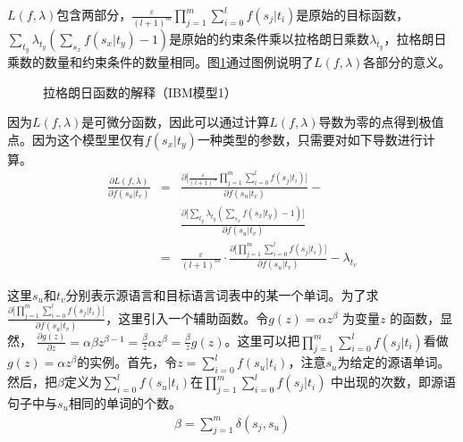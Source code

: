 \vspace{-0.3em}
\parinterval $L(f,\lambda)$包含两部分，$\frac{\varepsilon}{(l+1)^m}\prod_{j=1}^{m}\sum_{i=0}^{l}{f(s_j|t_i)}$是原始的目标函数，\\$\sum_{t_y}{\lambda_{t_y}(\sum_{s_x}{f(s_x|t_y)}-1)}$是原始的约束条件乘以拉格朗日乘数$\lambda_{t_y}$，拉格朗日乘数的数量和约束条件的数量相同。图\ref{fig:5-23}通过图例说明了$L(f,\lambda)$各部分的意义。

\begin{figure}[htp]
    \centering

   \caption{拉格朗日函数的解释（IBM模型1）}
   \label{fig:5-23}
\end{figure}

\noindent 因为$L(f,\lambda)$是可微分函数，因此可以通过计算$L(f,\lambda)$导数为零的点得到极值点。因为这个模型里仅有$f(s_x|t_y)$一种类型的参数，只需要对如下导数进行计算。
\begin{eqnarray}
\frac{\partial L(f,\lambda)}{\partial f(s_u|t_v)}& = & \frac{\partial \big[ \frac{\varepsilon}{(l+1)^{m}} \prod\limits_{j=1}^{m} \sum\limits_{i=0}^{l} f(s_j|t_i) \big]}{\partial f(s_u|t_v)} - \nonumber \\
                                                                     &     & \frac{\partial \big[ \sum_{t_y} \lambda_{t_y} (\sum_{s_x} f(s_x|t_y) -1) \big]}{\partial f(s_u|t_v)} \nonumber \\
                                                                     & =  & \frac{\varepsilon}{(l+1)^{m}} \cdot \frac{\partial \big[ \prod\limits_{j=1}^{m} \sum\limits_{i=0}^{l} f(s_j|t_i) \big]}{\partial f(s_u|t_v)} - \lambda_{t_v}
\label{eq:5-33}
\end{eqnarray}

\noindent 这里$s_u$和$t_v$分别表示源语言和目标语言词表中的某一个单词。为了求$\frac{\partial \big[ \prod\limits_{j=1}^{m} \sum\limits_{i=0}^{l} f(s_j|t_i) \big]}{\partial f(s_u|t_v)}$，这里引入一个辅助函数。令$g(z)=\alpha z^{\beta}$ 为变量$z$ 的函数，显然，
$\frac{\partial g(z)}{\partial z} = \alpha \beta z^{\beta-1} = \frac{\beta}{z}\alpha z^{\beta} = \frac{\beta}{z} g(z)$。这里可以把$\prod_{j=1}^{m} \sum_{i=0}^{l} f(s_j|t_i)$看做$g(z)=\alpha z^{\beta}$的实例。首先，令$z=\sum_{i=0}^{l}f(s_u|t_i)$，注意$s_u$为给定的源语单词。然后，把$\beta$定义为$\sum_{i=0}^{l}f(s_u|t_i)$在$\prod_{j=1}^{m} \sum_{i=0}^{l} f(s_j|t_i)$ 中出现的次数，即源语句子中与$s_u$相同的单词的个数。
\begin{eqnarray}
\beta=\sum_{j=1}^{m} \delta(s_j,s_u)
\label{eq:5-34}
\end{eqnarray}

